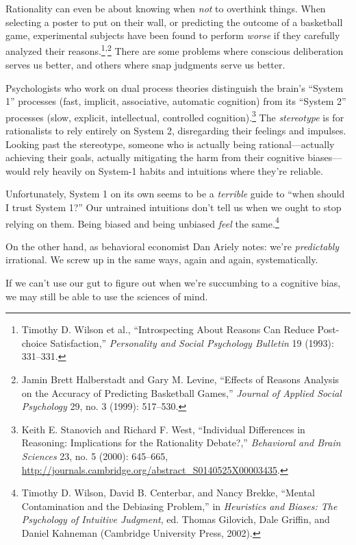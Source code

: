 \documentclass[letterpaper]{book}
\newcommand{\supercomma}{\textsuperscript{,}}
\newcommand{\comment}[1]{
}
\begin{document}
{
 Rationality can even be about knowing when \textit{not} to
overthink things. When selecting a poster to put on their wall, or
predicting the outcome of a basketball game, experimental subjects have
been found to perform \textit{worse} if they carefully analyzed their
reasons.\footnote{Timothy D. Wilson et al., ``Introspecting
About Reasons Can Reduce Post-choice Satisfaction,''
\textit{Personality and Social Psychology Bulletin} 19 (1993):
331--331.\comment{3}}\supercomma\footnote{Jamin Brett Halberstadt and Gary M. Levine,
``Effects of Reasons Analysis on the Accuracy of
Predicting Basketball Games,'' \textit{Journal of
Applied Social Psychology} 29, no. 3 (1999): 517--530.\comment{4}} There are some problems where conscious
deliberation serves us better, and others where snap judgments serve us
better.}

{
 Psychologists who work on dual process theories distinguish the
brain's ``System 1''
processes (fast, implicit, associative, automatic cognition) from its
``System 2'' processes (slow,
explicit, intellectual, controlled cognition).\footnote{Keith E. Stanovich and Richard F. West,
``Individual Differences in Reasoning: Implications
for the Rationality Debate?,'' \textit{Behavioral and
Brain Sciences} 23, no. 5 (2000): 645--665,
\url{http://journals.cambridge.org/abstract_S0140525X00003435}.\comment{5}} The
\textit{stereotype} is for rationalists to rely entirely on System 2,
disregarding their feelings and impulses. Looking past the stereotype,
someone who is actually being rational---actually achieving their
goals, actually mitigating the harm from their cognitive biases---would
rely heavily on System-1 habits and intuitions where
they're reliable.}

{
 Unfortunately, System 1 on its own seems to be a \textit{terrible}
guide to ``when should I trust System
1?'' Our untrained intuitions don't
tell us when we ought to stop relying on them. Being biased and being
unbiased \textit{feel} the same.\footnote{Timothy D. Wilson, David B. Centerbar, and Nancy Brekke,
``Mental Contamination and the Debiasing
Problem,'' in \textit{Heuristics and Biases: The
Psychology of Intuitive Judgment}, ed. Thomas Gilovich, Dale Griffin,
and Daniel Kahneman (Cambridge University Press, 2002).\comment{6}}}

{
 On the other hand, as behavioral economist Dan Ariely notes:
we're \textit{predictably} irrational. We screw up in
the same ways, again and again, systematically.}

{
 If we can't use our gut to figure out when
we're succumbing to a cognitive bias, we may still be
able to use the sciences of mind.}
\end{document}
